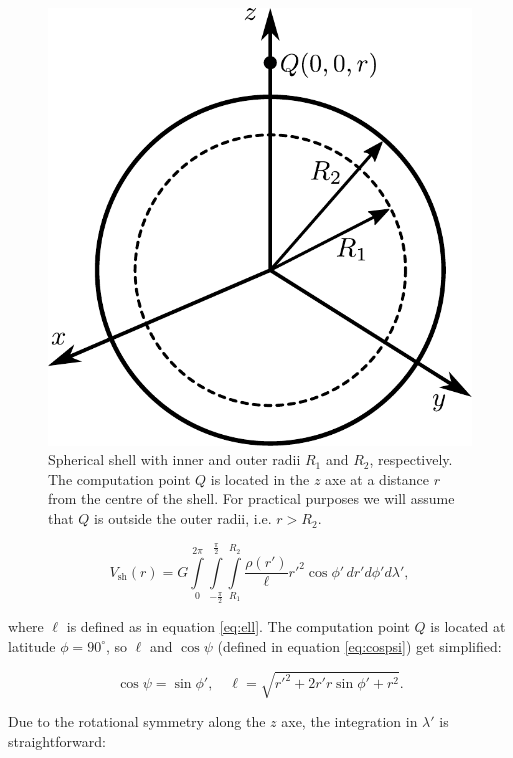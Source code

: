 \documentclass[extra]{gji}
\begin{document}
\begin{figure}
\centering
\includegraphics[width=0.9\linewidth]{figures/spherical-shell.pdf}
\caption{
Spherical shell with inner and outer radii $R_1$ and $R_2$, respectively.
The computation point $Q$ is located in the $z$ axe at a distance $r$ from the centre of the shell.
For practical purposes we will assume that $Q$ is outside the outer radii, i.e. $r > R_2$.
}
\label{fig:spherical-shell}
\end{figure}

\begin{equation}
    V_\text{sh}(r) = G 
    \int\limits_0^{2\pi}
    \int\limits_{-\frac{\pi}{2}}^\frac{\pi}{2}
    \int\limits_{R_1}^{R_2}
    \frac{\rho(r')}{\ell} {r'}^2 \cos\phi' \, 
    dr' d\phi' d\lambda',
\end{equation}

\noindent where $\ell$ is defined as in equation \ref{eq:ell}.
The computation point $Q$ is located at latitude $\phi=90^\circ$, so $\ell$ and $\cos\psi$ (defined in equation \ref{eq:cospsi}) get simplified:

\begin{equation}
    \cos\psi = \sin\phi', \quad
    \ell = \sqrt{r'^2 + 2 r' r \sin\phi' + r^2}.
\end{equation}

Due to the rotational symmetry along the $z$ axe, the integration in $\lambda'$ is straightforward:
\end{document}
